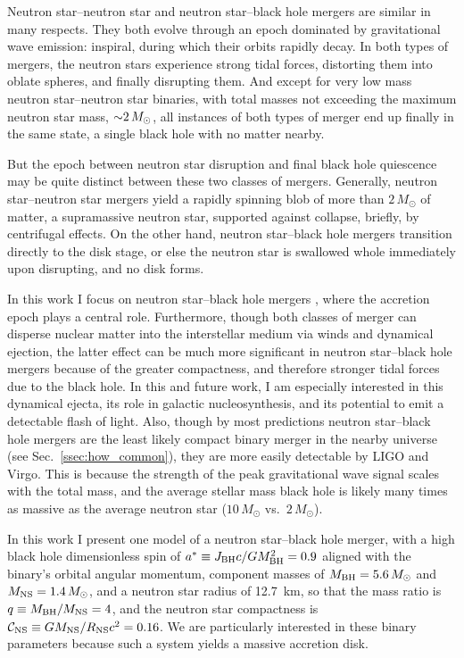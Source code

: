 Neutron star--neutron star \nsns and neutron star--black hole \nsbh mergers are
similar in many respects. They both evolve through an epoch dominated by
gravitational wave emission: inspiral, during which their orbits rapidly decay.
In both types of mergers, the neutron stars experience strong tidal forces,
distorting them into oblate spheres, and finally disrupting them.
And except for very low mass neutron star--neutron star \nsns binaries, with
total masses not exceeding the maximum neutron star mass, $\mathord{\sim}2\,M_\odot$,
all instances of both types of merger end up finally in the same state, a
single black hole with no matter nearby.

But the epoch between neutron star disruption and final black hole quiescence
may be quite distinct between these two classes of mergers. Generally, neutron
star--neutron star \nsns mergers yield a rapidly spinning blob of more than
$2\,M_\odot$ of matter, a supramassive neutron star,
supported against collapse, briefly, by centrifugal effects.
On the other hand, neutron star--black hole \nsbh mergers transition directly
to the disk stage, or else the neutron star is swallowed whole immediately upon
disrupting, and no disk forms.

In this work I focus on neutron star--black hole mergers \nsbh, where the
accretion epoch plays a central role. Furthermore, though both classes of
merger can disperse nuclear matter into the interstellar medium via winds and
dynamical ejection, the latter effect can be much more significant
in neutron star--black hole
mergers because of the greater compactness, and therefore stronger
tidal forces due to the black hole. In this and future work, I am especially
interested in this dynamical ejecta, its role in galactic nucleosynthesis,
and its potential to emit a detectable flash of light. Also, though by most
predictions neutron star--black hole mergers are the least likely compact
binary merger in the nearby universe (see Sec.~\ref{ssec:how_common}),
they are more easily detectable by LIGO and Virgo. This is because the
strength of the peak gravitational wave signal scales with the total mass,
and the average stellar mass black hole is likely many times as massive as the
average neutron star ($10\,M_\odot$ vs.\ $2\,M_\odot$).

In this work I present one model of a neutron star--black hole merger,
with a high black hole dimensionless spin of
$a^* \equiv J_{\rm BH}c/GM_{\rm BH}^2 =0.9$ aligned with the binary's orbital
angular momentum,
component masses of $M_{\rm BH}=5.6\,M_\odot$ and
$M_{\rm NS}=1.4\,M_\odot$,
and a neutron star radius of 12.7~km,
so that the mass ratio is $q \equiv M_{\rm BH}/M_{\rm NS}=4$,
and the neutron star compactness is
$\mathcal{C}_{\rm NS} \equiv G M_{\rm NS}/R_{\rm NS}c^2=0.16$.
We are particularly interested in these binary parameters because such a system
yields a massive accretion disk.

